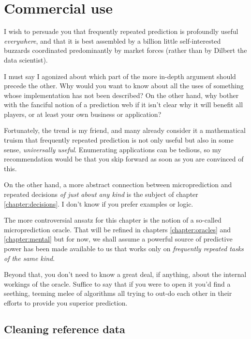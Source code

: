 \chapter{Commercial use}
\label{chapter:uses}

I wish to persuade you that frequently repeated prediction is profoundly useful {\em everywhere}, and that it is best assembled by a billion little self-interested buzzards coordinated predominantly by market forces (rather than by Dilbert the data scientist). 

I must say I agonized about which part of the more in-depth argument should precede the other. Why would you want to know about all the uses of something whose implementation has not been described? On the other hand, why bother with the fanciful notion of a prediction web if it isn't clear why it will benefit all players, or at least your own business or application? 

Fortunately, the trend is my friend, and many already consider it a mathematical truism that frequently repeated prediction is not only useful but also in some sense, {\em universally useful}. Enumerating applications can be tedious, so my recommendation would be that you skip forward as soon as you are convinced of this. 

On the other hand, a more abstract connection between microprediction and repeated decisions {\em of just about any kind} is the subject of chapter \ref{chapter:decisions}. I don't know if you prefer examples or logic.   

The more controversial ansatz for this chapter is the notion of a so-called microprediction oracle. That will be refined in chapters \ref{chapter:oracles} and \ref{chapter:mental} but for now, we shall assume a powerful source of predictive power has been made available to us that works only on {\em frequently repeated tasks of the same kind}. 

Beyond that, you don't need to know a great deal, if anything, about the internal workings of the oracle. Suffice to say that if you were to open it you'd find a seething, teeming melee of algorithms all trying to out-do each other in their efforts to provide you superior prediction. 



\section{Cleaning reference data}
\label{sec:cleaning}

